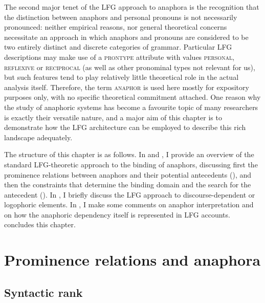 \documentclass[output=paper,hidelinks]{langscibook}
\begin{document}
The second major tenet of the LFG approach to anaphora is the recognition that the distinction between anaphors and personal pronouns is not necessarily pronounced: neither empirical reasons, nor general theoretical concerns necessitate an approach in which anaphors and pronouns are considered to be two entirely distinct and discrete categories of grammar. Particular LFG descriptions may make use of a \textsc{prontype} attribute with values \textsc{personal}, \textsc{reflexive} or \textsc{reciprocal} (as well as other pronominal types not relevant for us), but such features tend to play relatively little theoretical role in the actual analysis itself. Therefore, the term \textsc{anaphor} is used here mostly for expository purposes only, with no specific theoretical commitment attached. One reason why the study of anaphoric systems has become a favourite topic of many researchers is exactly their versatile nature, and a major aim of this chapter is to demonstrate how the LFG architecture can be employed to describe this rich landscape adequately.

The structure of this chapter is as follows. In  and , I provide an overview of the standard LFG-theoretic approach to the binding of anaphors, discussing first the prominence relations between anaphors and their potential antecedents (), and then the constraints that determine the binding domain and the search for the antecedent ().  In , I briefly discuss the LFG approach to discourse-dependent or logophoric elements. In , I make some comments on anaphor interpretation and on how the anaphoric dependency itself is represented in LFG accounts.  concludes this chapter.

\section{Prominence relations and anaphora}
\label{sec:Anaphora:2}

\subsection{Syntactic rank}
\label{sec:Anaphora:2.1}
\end{document}
